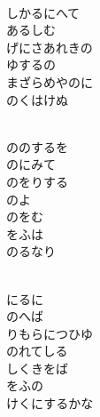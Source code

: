 \documentclass[10pt,b5j]{tarticle} %
\begin{document}
\vspace{1.5em} %
\newcommand{\linespace}{0.5em} %
\newcommand{\blocksize}{0.5\hsize} %
\newcommand{\itemmargin}{6em} %
\begin{enumerate} %
    \setlength{\itemindent}{\itemmargin} %
    \begin{minipage}[c]{\blocksize}
    
        \vspace{\linespace}
        \item~\\
        しかるにへて\\
        あるしむ\\
        げにさあれきの\\
        ゆするの\\
        まざらめやのに\\
        のくはけぬ
        
        \vspace{\linespace}
        \item~\\
        ののするを\\
        のにみて\\
        のをりする\\
        のよ\\
        のをむ\\
        をふは\\
        のるなり
        
        \vspace{\linespace}
        \item~\\
        にるに\\
        のへば\\
        りもらにつひゆ\\
        のれてしる\\
        しくきをば\\
        をふの\\
        けくにするかな
        

\end{minipage}
\end{enumerate}
\end{document}

